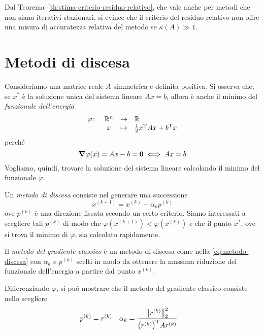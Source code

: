 	\begin{osservazione}
		Dal Teorema~\ref{th:stima-criterio-residuo-relativo}, che vale anche per metodi che non siano iterativi stazionari, si evince che il criterio del residuo relativo non offre una misura di accuratezza relativa del metodo se \(\kappa (A) \gg 1\).
	\end{osservazione}

\section{Metodi di discesa}
	
	\noindent Consideriamo una matrice reale \(A\) simmetrica e definita positiva. Si osserva che, se \(x^*\) è la soluzione unica del sistema lineare \(A x = b\), allora è anche il minimo del \emph{funzionale dell'energia}
	\begin{equation}\label{eq:funzionale-energia}
		\begin{array}{rccl}
			\varphi \colon & \mathbb{R}^n & \to & \mathbb{R} \\
			& x & \mapsto & \frac{1}{2} x^\mathrm{T}\relax A x + b^\mathrm{T}\relax x
		\end{array}
	\end{equation}
	perché
	\begin{equation*}
		\grad{\varphi (x)} = A x - b = \mathbf{0} \iff A x = b
	\end{equation*}
	Vogliamo, quindi, trovare la soluzione del sistema lineare calcolando il minimo del funzionale \(\varphi\).
	
	Un \emph{metodo di discesa} consiste nel generare una successione
	\begin{equation}\label{eq:metodo-discesa}
		x^{(k + 1)} = x^{(k)} + \alpha_k p^{(k)}
	\end{equation}
	ove \(p^{(k)}\) è una direzione fissata secondo un certo criterio. Siamo interessati a scegliere tali \(p^{(k)}\) di modo che \(\varphi (x^{(k + 1)}) < \varphi (x^{(k)})\) e che il punto \(x^*\), ove si trova il minimo di \(\varphi\), sia calcolato rapidamente.
	
	\begin{definizione}
		Il \emph{metodo del gradiente classico} è un metodo di discesa come nella \eqref{eq:metodo-discesa} con \(\alpha_k\) e \(p^{(k)}\) scelti in modo da ottenere la massima riduzione del funzionale dell'energia a partire dal punto \(x^{(k)}\).
	\end{definizione}

	Differenziando \(\varphi\), si può mostrare che il metodo del gradiente classico consiste nello scegliere
	\begin{align}
		p^{(k)} &= r^{(k)} &
		\alpha_k &= \frac{\bigl\| r^{(k)} \bigr\|_2^2}{\qty(r^{(k)})^\mathrm{T}\relax A r^{(k)}}
	\end{align}
	
